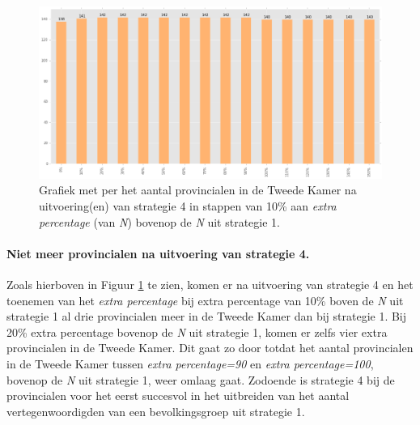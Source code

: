 \begin{figure}[H]

	\includegraphics[width=\linewidth]	{topNextrapercentage_aantal_provincialen_overzicht.png}

			\caption{Grafiek met per het aantal provincialen in de Tweede Kamer na uitvoering(en) van strategie 4 in stappen van 10\% aan \textit{extra percentage} (van \textit{N}) bovenop de \textit{N} uit strategie 1.}

\label{fig:bcS4P}
\end{figure}

\paragraph{Niet meer provincialen na uitvoering van strategie 4.}
Zoals hierboven in Figuur \ref{fig:bcS4P}  te zien, komen er na uitvoering van strategie 4 en het toenemen van het \textit{extra percentage} bij extra percentage van 10\% boven de \textit{N} uit strategie 1 al drie provincialen meer in de Tweede Kamer dan bij strategie 1. Bij 20\% extra percentage bovenop de \textit{N} uit strategie 1, komen er zelfs vier extra provincialen in de Tweede Kamer. Dit gaat zo door totdat het aantal provincialen in de Tweede Kamer tussen \textit{extra percentage=90} en \textit{extra percentage=100}, bovenop de \textit{N} uit strategie 1, weer omlaag gaat. Zodoende is strategie 4 bij de provincialen voor het eerst succesvol in het uitbreiden van het aantal vertegenwoordigden van een bevolkingsgroep uit strategie 1.


